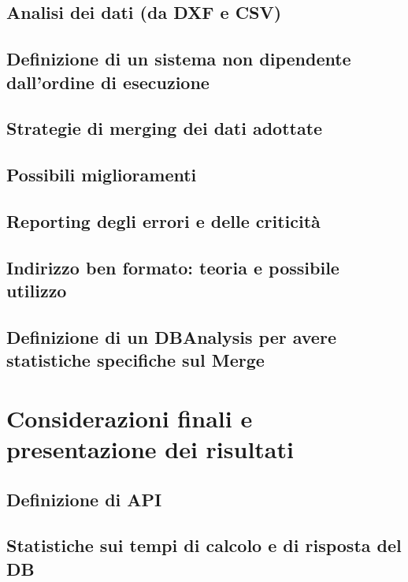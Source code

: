 \documentclass[12pt]{report}
\begin{document}
\newpage
\section{Analisi dei dati (da DXF e CSV)}

\newpage
\section{Definizione di un sistema non dipendente dall'ordine di esecuzione}

\newpage
\section{Strategie di merging dei dati adottate}

\newpage
\section{Possibili miglioramenti}

\newpage
\section{Reporting degli errori e delle criticità}

\newpage
\section{Indirizzo ben formato: teoria e possibile utilizzo}

\newpage
\section{Definizione di un DBAnalysis per avere statistiche specifiche sul Merge}


\chapter{Considerazioni finali e presentazione dei risultati}
\label{cap3}

\section{Definizione di API}

\newpage
\section{Statistiche sui tempi di calcolo e di risposta del DB}
\end{document}
